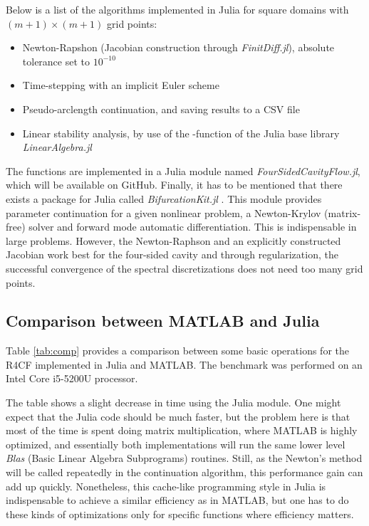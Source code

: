 Below is a list of the algorithms implemented in Julia for square domains with
$(m+1) \times (m+1)$ grid points:

\begin{itemize}
  \item Newton-Rapshon (Jacobian construction through \emph{FinitDiff.jl}),
    absolute tolerance set to $10^{-10}$
  \item Time-stepping with an implicit Euler scheme
  \item Pseudo-arclength continuation, and saving results to a CSV file
  \item Linear stability analysis, by use of the -function of the
    Julia base library \emph{LinearAlgebra.jl}
\end{itemize}

The functions are implemented in a Julia module named
\emph{FourSidedCavityFlow.jl}, which will be available on GitHub. Finally, it
has to be mentioned that there exists a package for Julia called
\emph{BifurcationKit.jl} \citep{veltz2020}. This module provides parameter
continuation for a given nonlinear problem, a Newton-Krylov (matrix-free)
solver and forward mode automatic differentiation. This is indispensable in
large problems. However, the Newton-Raphson and an explicitly constructed
Jacobian work best for the four-sided cavity and through regularization, the
successful convergence of the spectral discretizations does not need too many
grid points.

\subsection{Comparison between MATLAB and Julia}

Table \ref{tab:comp} provides a comparison between some basic operations for
the R4CF implemented in Julia and MATLAB. The benchmark was performed on an
Intel Core i5-5200U processor.

The table shows a slight decrease in time using the Julia module. One might
expect that the Julia code should be much faster, but the problem here is that
most of the time is spent doing matrix multiplication, where MATLAB is highly
optimized, and essentially both implementations will run the same lower level
\emph{Blas} (Basic Linear Algebra Subprograms) routines. Still, as the Newton's
method will be called repeatedly in the continuation algorithm, this
performance gain can add up quickly. Nonetheless, this cache-like programming
style in Julia is indispensable to achieve a similar efficiency as in MATLAB,
but one has to do these kinds of optimizations only for specific functions
where efficiency matters.

